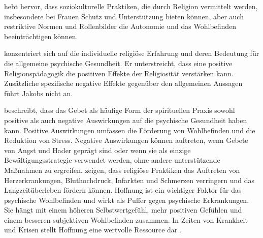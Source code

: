 \textcite{Hemel2023} hebt hervor, dass soziokulturelle Praktiken, die durch Religion vermittelt werden, insbesondere bei Frauen Schutz und Unterstützung bieten können, aber auch restriktive Normen und Rollenbilder die Autonomie und das Wohlbefinden beeinträchtigen können.

\textcite{Jakobs_2018} konzentriert sich auf die individuelle religiöse Erfahrung und deren Bedeutung für die allgemeine psychische Gesundheit. Er unterstreicht, dass eine positive Religionspädagogik die positiven Effekte der Religiosität verstärken kann. Zusätzliche spezifische negative Effekte gegenüber den allgemeinen Aussagen führt Jakobs nicht an.

\textcite{Krause2015} beschreibt, dass das Gebet als häufige Form der spirituellen Praxis sowohl positive als auch negative Auswirkungen auf die psychische Gesundheit haben kann. Positive Auswirkungen umfassen die Förderung von Wohlbefinden und die Reduktion von Stress. Negative Auswirkungen können auftreten, wenn Gebete von Angst und Hader geprägt sind oder wenn sie als einzige Bewältigungsstrategie verwendet werden, ohne andere unterstützende Maßnahmen zu ergreifen. \textcite{SeyboldHill2001} zeigen, dass religiöse Praktiken das Auftreten von Herzerkrankungen, Bluthochdruck, Infarkten und Schmerzen verringern und das Langzeitüberleben fördern können. Hoffnung ist ein wichtiger Faktor für das psychische Wohlbefinden und wirkt als Puffer gegen psychische Erkrankungen. Sie hängt mit einem höheren Selbstwertgefühl, mehr positiven Gefühlen und einem besseren subjektiven Wohlbefinden zusammen. In Zeiten von Krankheit und Krisen stellt Hoffnung eine wertvolle Ressource dar \parencite{Krause2015}. 










